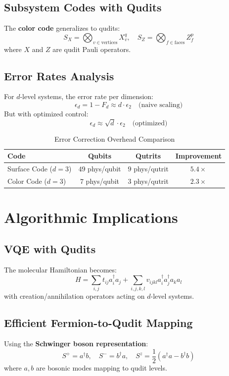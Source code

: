 \documentclass[12pt,twocolumn]{article}
\begin{document}
\subsection{Subsystem Codes with Qudits}
The \textbf{color code} generalizes to qudits:
\[
S_X = \bigotimes_{v \in \text{vertices}} X_v^q, \quad S_Z = \bigotimes_{f \in \text{faces}} Z_f^p
\]
where $X$ and $Z$ are qudit Pauli operators.

\subsection{Error Rates Analysis}
For $d$-level systems, the error rate per dimension:
\[
\epsilon_d = 1 - F_d \approx d \cdot \epsilon_2 \quad \text{(naive scaling)}
\]
But with optimized control:
\[
\epsilon_d \approx \sqrt{d} \cdot \epsilon_2 \quad \text{(optimized)}
\]

\begin{table}[H]
\centering
\caption{Error Correction Overhead Comparison}
\begin{tabular}{lccc}
\toprule
\textbf{Code} & \textbf{Qubits} & \textbf{Qutrits} & \textbf{Improvement} \\
\midrule
Surface Code ($d=3$) & $49$ phys/qubit & $9$ phys/qutrit & $5.4\times$ \\
Color Code ($d=3$) & $7$ phys/qubit & $3$ phys/qutrit & $2.3\times$ \\
\bottomrule
\end{tabular}
\end{table}

\section{Algorithmic Implications}

\subsection{VQE with Qudits}
The molecular Hamiltonian becomes:
\[
H = \sum_{i,j} t_{ij} a_i^\dagger a_j + \sum_{i,j,k,l} v_{ijkl} a_i^\dagger a_j^\dagger a_k a_l
\]
with creation/annihilation operators acting on $d$-level systems.

\subsection{Efficient Fermion-to-Qudit Mapping}
Using the \textbf{Schwinger boson representation}:
\[
S^+ = a^\dagger b, \quad S^- = b^\dagger a, \quad S^z = \frac{1}{2}(a^\dagger a - b^\dagger b)
\]
where $a,b$ are bosonic modes mapping to qudit levels.
\end{document}
